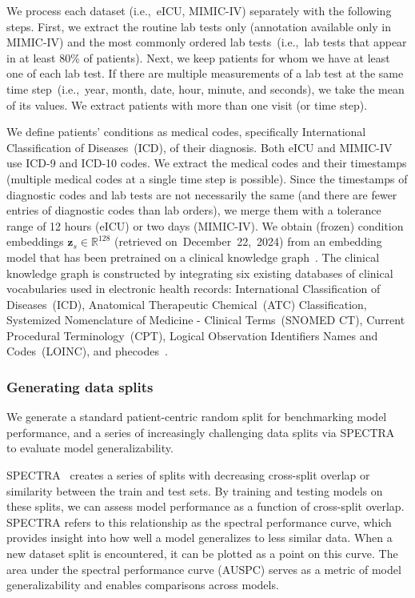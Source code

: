 %
We process each dataset (i.e.,~eICU, MIMIC-IV) separately with the following steps. First, we extract the routine lab tests only (annotation available only in MIMIC-IV) and the most commonly ordered lab tests~(i.e.,~lab tests that appear in at least 80\% of patients). Next, we keep patients for whom we have at least one of each lab test. If there are multiple measurements of a lab test at the same time step~(i.e.,~year, month, date, hour, minute, and seconds), we take the mean of its values. We extract patients with more than one visit (or time step).

We define patients' conditions as medical codes, specifically International Classification of Diseases~(ICD)\nocite{icd}, of their diagnosis. Both eICU and MIMIC-IV use ICD-9 and ICD-10 codes. We extract the medical codes and their timestamps (multiple medical codes at a single time step is possible). Since the timestamps of diagnostic codes and lab tests are not necessarily the same (and there are fewer entries of diagnostic codes than lab orders), we merge them with a tolerance range of 12 hours (eICU) or two days (MIMIC-IV). We obtain (frozen) condition embeddings $\mathbf{z}_s \in \mathbb{R}^{128}$ (retrieved on~December~22,~2024) from an embedding model that has been pretrained on a clinical knowledge graph~\cite{johnson2024unified}. The clinical knowledge graph is constructed by integrating six existing databases of clinical vocabularies used in electronic health records: International Classification of Diseases~(ICD), Anatomical Therapeutic Chemical~(ATC) Classification, Systemized Nomenclature of Medicine - Clinical Terms~(SNOMED CT), Current Procedural Terminology~(CPT), Logical Observation Identifiers Names and Codes~(LOINC), and phecodes~\cite{johnson2024unified}.

\subsubsection{Generating data splits}

We generate a standard patient-centric random split for benchmarking model performance, and a series of increasingly challenging data splits via SPECTRA~\cite{ektefaie2024evaluating} to evaluate model generalizability.

%
SPECTRA~\cite{ektefaie2024evaluating} creates a series of splits with decreasing cross-split overlap or similarity between the train and test sets. By training and testing models on these splits, we can assess model performance as a function of cross-split overlap. SPECTRA refers to this relationship as the spectral performance curve, which provides insight into how well a model generalizes to less similar data. When a new dataset split is encountered, it can be plotted as a point on this curve. The area under the spectral performance curve (AUSPC) serves as a metric of model generalizability and enables comparisons across models.

